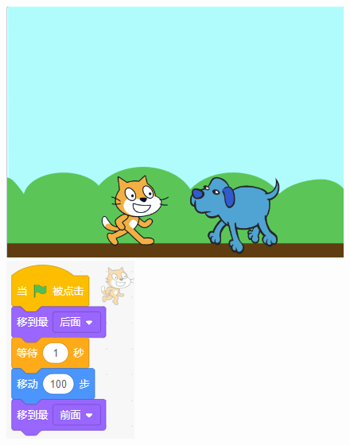 \documentclass[10pt, a4paper]{article}
\begin{document}
\begin{enumerate}
\begin{figure}[htbp]
\begin{minipage}[t]{.4\textwidth}
\begin{minipage}[t]{.36\textwidth}
                    \centering
                    \includegraphics[width=\textwidth]{figure/3-1.png}
                \end{minipage}
                \begin{minipage}[t]{.3\textwidth}
                    \centering
                    \includegraphics[width=\textwidth]{figure/3-2.png}

\end{minipage}
\end{minipage}
\end{figure}
\end{enumerate}
\end{document}
